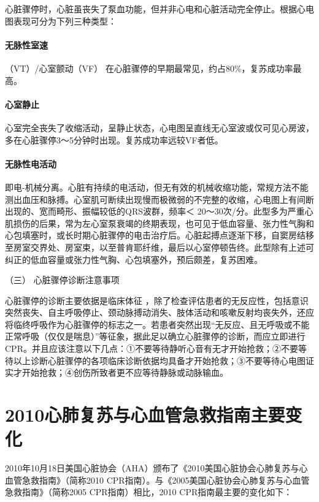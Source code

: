 心脏骤停时，心脏虽丧失了泵血功能，但并非心电和心脏活动完全停止。根据心电图表现可分为下列三种类型：

\paragraph{无脉性室速}

（VT）/心室颤动（VF） 在心脏骤停的早期最常见，约占80\%，复苏成功率最高。

\paragraph{心室静止}

心室完全丧失了收缩活动，呈静止状态，心电图呈直线无心室波或仅可见心房波，多在心脏骤停3～5分钟时出现。复苏成功率远较VF者低。

\paragraph{无脉性电活动}

即电-机械分离。心脏有持续的电活动，但无有效的机械收缩功能，常规方法不能测出血压和脉搏。心室肌可断续出现慢而极微弱的不完整的收缩，心电图上有间断出现的、宽而畸形、振幅较低的QRS波群，频率＜
20～30次/分。此型多为严重心肌损伤的后果，常为左心室泵衰竭的终期表现，也可见于低血容量、张力性气胸和心包填塞时，或长时期心脏骤停的电击治疗后。心脏起搏点逐渐下移，自窦房结移至房室交界处、房室束，以至普肯耶纤维，最后以心室停顿告终。此型除有上述可纠正的低血容量或张力性气胸、心包填塞外，预后颇差，复苏困难。

\hypertarget{text00281.htmlux5cux23CHP10-1-2-2-3}{}
（三） 心脏骤停诊断注意事项

心脏骤停的诊断主要依据是临床体征
，除了检查评估患者的无反应性，包括意识突然丧失、自主呼吸停止、颈动脉搏动消失、肢体活动和咳嗽反射均丧失外，还应将临终呼吸作为心脏骤停的标志之一。若患者突然出现“无反应、且无呼吸或不能正常呼吸（仅仅是喘息）”等征象，据此足以确立心脏骤停的诊断，而应立即进行CPR。并且应该注意以下几点：①不要等待静听心音有无才开始抢救；②不要等待以上诊断心脏骤停的各项临床诊断依据均具备才开始抢救；③不要等待心电图证实才开始抢救；④创伤所致者更不应等待静脉或动脉输血。

\protect\hypertarget{text00282.html}{}{}

\section{2010心肺复苏与心血管急救指南主要变化}

2010年10月18日美国心脏协会（AHA）颁布了《2010美国心脏协会心肺复苏与心血管急救指南》（简称2010
CPR指南）。与《2005美国心脏协会心肺复苏与心血管急救指南》（简称2005
CPR指南）相比，2010 CPR指南最主要的变化如下：

